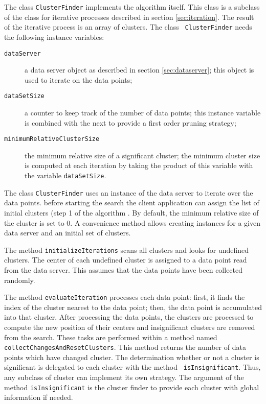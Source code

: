 \documentclass[twoside]{book}
\begin{document}
The class {\tt ClusterFinder} implements the algorithm itself.
This class is a subclass of the class for iterative processes
described in section \ref{sec:iteration}. The result of the
iterative process is an array of clusters. The class {\tt
ClusterFinder}  needs the following instance variables:
\begin{description}
  \item[\tt dataServer] a data server object as described in
  section \ref{sec:dataserver}; this object is used to iterate on
  the data points;
  \item[\tt dataSetSize] a counter to keep track of the number of
  data points; this instance variable is combined with the next to
  provide a first order pruning strategy;
  \item[\tt minimumRelativeClusterSize] the minimum relative size
  of a significant cluster; the minimum cluster
  size is computed at each iteration by taking the product of this variable with the
  variable {\tt dataSetSize}.
\end{description}

The class {\tt ClusterFinder} uses an instance of the data server
to iterate over the data points. before starting the search the
client application can assign the list of initial clusters (step 1
of the algorithm . By default, the minimum relative size of the
cluster is set to 0. A convenience method allows creating
instances for a given data server and an initial set of clusters.

The method {\tt initializeIterations} scans all clusters and looks
for undefined clusters. The center of each undefined cluster is
assigned to a data point read from the data server. This assumes
that the data points have been collected randomly.

\noindent The method {\tt evaluateIteration} processes each data
point: first, it finds the index of the cluster nearest to the
data point; then, the data point is accumulated into that cluster.
After processing the data points, the clusters are processed to
compute the new position of their centers and insignificant
clusters are removed from the search. These tasks are performed
within a method named {\tt collectChangesAndResetClusters}. This
method returns the number of data points which have changed
cluster. The determination whether or not a cluster is significant
is delegated to each cluster with the method {\tt
isInsignificant}. Thus, any subclass of cluster can implement its
own strategy. The argument of the method {\tt isInsignificant} is
the cluster finder to provide each cluster with global information
if needed.
\end{document}
